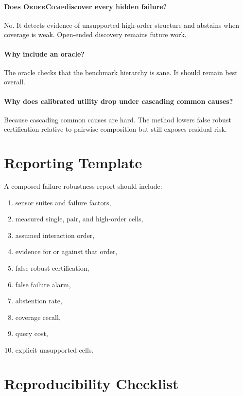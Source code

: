 \documentclass{article}
\newcommand{\method}{\textsc{OrderComp}}
\begin{document}
\paragraph{Does \method discover every hidden failure?}
No. It detects evidence of unsupported high-order structure and abstains when coverage is weak. Open-ended discovery remains future work.

\paragraph{Why include an oracle?}
The oracle checks that the benchmark hierarchy is sane. It should remain best overall.

\paragraph{Why does calibrated utility drop under cascading common causes?}
Because cascading common causes are hard. The method lowers false robust certification relative to pairwise composition but still exposes residual risk.

\section{Reporting Template}

A composed-failure robustness report should include:
\begin{enumerate}[leftmargin=1.5em,itemsep=0.25em]
    \item sensor suites and failure factors,
    \item measured single, pair, and high-order cells,
    \item assumed interaction order,
    \item evidence for or against that order,
    \item false robust certification,
    \item false failure alarm,
    \item abstention rate,
    \item coverage recall,
    \item query cost,
    \item explicit unsupported cells.
\end{enumerate}

\section{Reproducibility Checklist}
\end{document}
